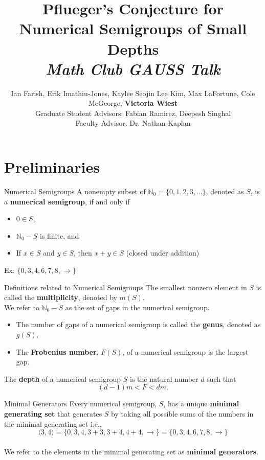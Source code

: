 \documentclass{beamer}
\title{Pflueger's Conjecture for Numerical Semigroups of Small Depths\\[5pt]\footnotesize{\textit{Math Club GAUSS Talk}}}
\author{Ian Farish, Erik Imathiu-Jones, Kaylee Seojin Lee Kim, Max LaFortune, Cole McGeorge, \textbf{Victoria Wiest}
\\[15pt] Graduate Student Advisors: Fabian Ramirez, Deepesh Singhal
\\[15pt] Faculty Advisor: Dr. Nathan Kaplan}
\institute{}
\date{}
\newcommand{\N}{{\mathbb N}}
\begin{document}
\begin{frame}
\titlepage
\end{frame}

\section{Preliminaries}
\begin{frame}{Numerical Semigroups}
    A nonempty subset of $\N_{0}=\{0,1,2,3,\dots\}$, denoted as $S$, is a \textbf{numerical semigroup}, if and only if

    \begin{itemize}
        \item $0\in S$,
        \item $\N_{0} - S$ is finite, and
        \item If $x\in S$ and $y\in S$, then $x+y\in S$ (closed under addition)
    \end{itemize}\vspace{8pt}
    Ex: $\{0,3,4,6,7,8,\to\}$
    
\end{frame}

\begin{frame}{Definitions related to Numerical Semigroups}
    The smallest nonzero element in $S$ is called the \textbf{multiplicity}, denoted by $m(S)$.\\[15pt]
    
    We refer to $\N_{0} - S$ as the set of gaps in the numerical semigroup. 
    \begin{itemize}
        \item The number of gaps of a numerical semigroup is called the \textbf{genus}, denoted as $g(S).$
        \item The \textbf{Frobenius number}, $F(S)$, of a numerical semigroup is the largest gap.
    \end{itemize}
    \vspace{15pt}
    The \textbf{depth} of a numerical semigroup $S$ is the natural number $d$ such that 
    \[(d-1)m<F<dm.\]
\end{frame}

\begin{frame}{Minimal Generators}
    Every numerical semigroup, $S$, has a unique \textbf{minimal generating set} that generates $S$ by taking all possible sums of the numbers in the minimal generating set i.e., 
    \[\langle3,4\rangle=\{0,3,4,3+3,3+4,4+4,\to\}=\{0,3,4,6,7,8,\to\}\]\\[15pt]
    
    We refer to the elements in the minimal generating set as \textbf{minimal generators}.
\end{frame}
\end{document}
